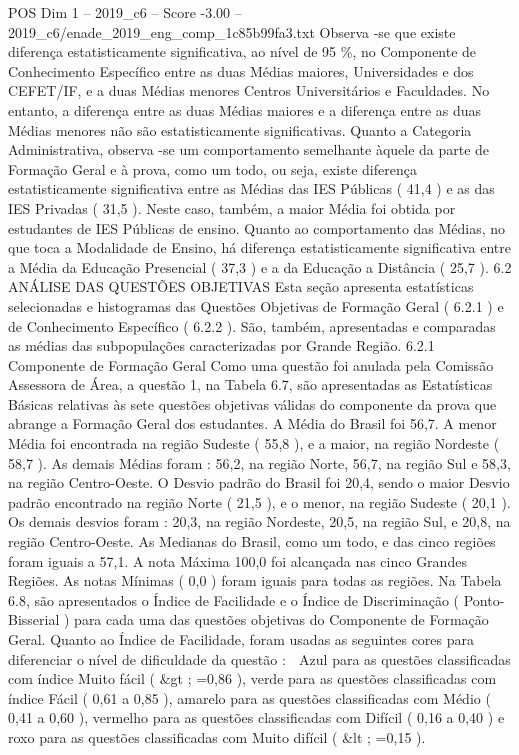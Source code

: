 \begin{textsample}{POS Dim 1 – 2019\_c6 – Score -3.00 – 2019\_c6/enade\_2019\_eng\_comp\_1c85b99fa3.txt}
Observa -se que existe diferença estatisticamente significativa, ao nível de 95 \%, no Componente de Conhecimento Específico entre as duas Médias maiores, Universidades e dos CEFET/IF, e a duas Médias menores Centros Universitários e Faculdades.
No entanto, a diferença entre as duas Médias maiores e a diferença entre as duas Médias menores não são estatisticamente significativas.
Quanto a Categoria Administrativa, observa -se um comportamento semelhante àquele da parte de Formação Geral e à prova, como um todo, ou seja, existe diferença estatisticamente significativa entre as Médias das IES Públicas ( 41,4 ) e as das IES Privadas ( 31,5 ).
Neste caso, também, a maior Média foi obtida por estudantes de IES Públicas de ensino.
Quanto ao comportamento das Médias, no que toca a Modalidade de Ensino, há diferença estatisticamente significativa entre a Média da Educação Presencial ( 37,3 ) e a da Educação a Distância ( 25,7 ). 6.2 ANÁLISE DAS QUESTÕES OBJETIVAS Esta seção apresenta estatísticas selecionadas e histogramas das Questões Objetivas de Formação Geral ( 6.2.1 ) e de Conhecimento Específico ( 6.2.2 ).
São, também, apresentadas e comparadas as médias das subpopulações caracterizadas por Grande Região. 6.2.1 Componente de Formação Geral Como uma questão foi anulada pela Comissão Assessora de Área, a questão 1, na Tabela 6.7, são apresentadas as Estatísticas Básicas relativas às sete questões objetivas válidas do componente da prova que abrange a Formação Geral dos estudantes.
A Média do Brasil foi 56,7.
A menor Média foi encontrada na região Sudeste ( 55,8 ), e a maior, na região Nordeste ( 58,7 ).
As demais Médias foram : 56,2, na região Norte, 56,7, na região Sul e 58,3, na região Centro-Oeste.
O Desvio padrão do Brasil foi 20,4, sendo o maior Desvio padrão encontrado na região Norte ( 21,5 ), e o menor, na região Sudeste ( 20,1 ).
Os demais desvios foram : 20,3, na região Nordeste, 20,5, na região Sul, e 20,8, na região Centro-Oeste.
As Medianas do Brasil, como um todo, e das cinco regiões foram iguais a 57,1.
A nota Máxima 100,0 foi alcançada nas cinco Grandes Regiões.
As notas Mínimas ( 0,0 ) foram iguais para todas as regiões.
Na Tabela 6.8, são apresentados o Índice de Facilidade e o Índice de Discriminação ( Ponto-Bisserial ) para cada uma das questões objetivas do Componente de Formação Geral.
Quanto ao Índice de Facilidade, foram usadas as seguintes cores para diferenciar o nível de dificuldade da questão :  Azul para as questões classificadas com índice Muito fácil ( \&gt ; =0,86 ), verde para as questões classificadas com índice Fácil ( 0,61 a 0,85 ), amarelo para as questões classificadas com Médio ( 0,41 a 0,60 ), vermelho para as questões classificadas com Difícil ( 0,16 a 0,40 ) e roxo para as questões classificadas com Muito difícil ( \&lt ; =0,15 ).

\end{textsample}
